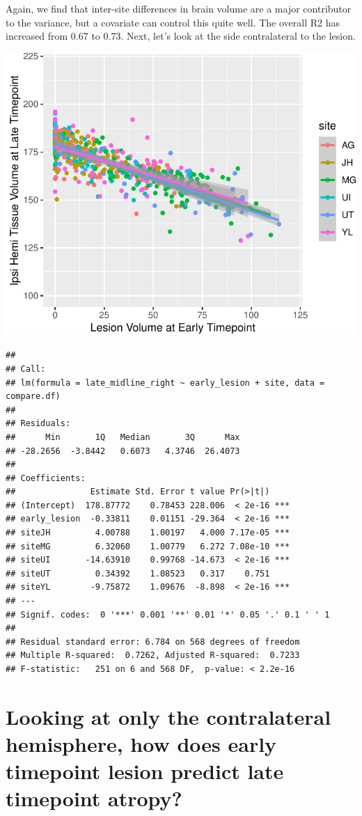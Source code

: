 \documentclass[
]{article}
\begin{document}
Again, we find that inter-site differences in brain volume are a major
contributor to the variance, but a covariate can control this quite
well. The overall R2 has increased from 0.67 to 0.73. Next, let's look
at the side contralateral to the lesion.

\begin{center}\includegraphics{paper_files/figure-latex/plot_harm_ipsi-1} \end{center}

\begin{verbatim}
## 
## Call:
## lm(formula = late_midline_right ~ early_lesion + site, data = compare.df)
## 
## Residuals:
##      Min       1Q   Median       3Q      Max 
## -28.2656  -3.8442   0.6073   4.3746  26.4073 
## 
## Coefficients:
##               Estimate Std. Error t value Pr(>|t|)    
## (Intercept)  178.87772    0.78453 228.006  < 2e-16 ***
## early_lesion  -0.33811    0.01151 -29.364  < 2e-16 ***
## siteJH         4.00788    1.00197   4.000 7.17e-05 ***
## siteMG         6.32060    1.00779   6.272 7.08e-10 ***
## siteUI       -14.63910    0.99768 -14.673  < 2e-16 ***
## siteUT         0.34392    1.08523   0.317    0.751    
## siteYL        -9.75872    1.09676  -8.898  < 2e-16 ***
## ---
## Signif. codes:  0 '***' 0.001 '**' 0.01 '*' 0.05 '.' 0.1 ' ' 1
## 
## Residual standard error: 6.784 on 568 degrees of freedom
## Multiple R-squared:  0.7262, Adjusted R-squared:  0.7233 
## F-statistic:   251 on 6 and 568 DF,  p-value: < 2.2e-16
\end{verbatim}

\hypertarget{looking-at-only-the-contralateral-hemisphere-how-does-early-timepoint-lesion-predict-late-timepoint-atropy}{%
\section{Looking at only the contralateral hemisphere, how does early
timepoint lesion predict late timepoint
atropy?}\label{looking-at-only-the-contralateral-hemisphere-how-does-early-timepoint-lesion-predict-late-timepoint-atropy}}
\end{document}
